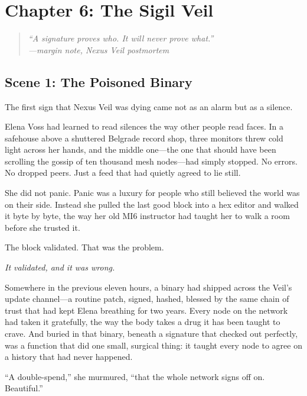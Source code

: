 \hypertarget{chapter-6-the-sigil-veil}{%
\section{Chapter 6: The Sigil Veil}\label{chapter-6-the-sigil-veil}}

\begin{quote}
\itshape ``A signature proves who. It will never prove what.''\\
\normalfont\hfill---margin note, Nexus Veil postmortem
\end{quote}

\hypertarget{scene-1-the-poisoned-binary}{%
\subsection{Scene 1: The Poisoned Binary}\label{scene-1-the-poisoned-binary}}

The first sign that Nexus Veil was dying came not as an alarm but as a silence.

Elena Voss had learned to read silences the way other people read faces. In a safehouse above a shuttered Belgrade record shop, three monitors threw cold light across her hands, and the middle one---the one that should have been scrolling the gossip of ten thousand mesh nodes---had simply stopped. No errors. No dropped peers. Just a feed that had quietly agreed to lie still.

She did not panic. Panic was a luxury for people who still believed the world was on their side. Instead she pulled the last good block into a hex editor and walked it byte by byte, the way her old MI6 instructor had taught her to walk a room before she trusted it.

The block validated. That was the problem.

\emph{It validated, and it was wrong.}

Somewhere in the previous eleven hours, a binary had shipped across the Veil's update channel---a routine patch, signed, hashed, blessed by the same chain of trust that had kept Elena breathing for two years. Every node on the network had taken it gratefully, the way the body takes a drug it has been taught to crave. And buried in that binary, beneath a signature that checked out perfectly, was a function that did one small, surgical thing: it taught every node to agree on a history that had never happened.

``A double-spend,'' she murmured, ``that the whole network signs off on. Beautiful.''

